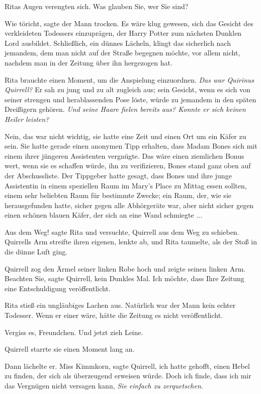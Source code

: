 Ritas Augen verengten sich. \glqq Was glauben Sie, wer Sie sind?\grqq{}

\glqq{}Wie töricht\grqq{}, sagte der Mann trocken. \glqq{}Es wäre klug gewesen,
sich das Gesicht des verkleideten Todessers einzuprägen, der Harry Potter zum
nächsten Dunklen Lord ausbildet. Schließlich\grqq{}, ein dünnes Lächeln, \glqq{}
klingt das sicherlich nach jemandem, dem man nicht auf der Straße begegnen
möchte, vor allem nicht, nachdem man in der Zeitung über ihn hergezogen
hat.\grqq{}

Rita brauchte einen Moment, um die Anspielung einzuordnen. \emph{Das war
Quirinus Quirrell?} Er sah zu jung und zu alt zugleich aus; sein Gesicht, wenn
es sich von seiner strengen und herablassenden Pose löste, würde zu jemandem in
den späten Dreißigern gehören. \emph{Und seine Haare fielen bereits aus? Konnte
er sich keinen Heiler leisten?}


Nein, das war nicht wichtig, sie hatte eine Zeit und einen Ort um ein Käfer zu
sein. Sie hatte gerade einen anonymen Tipp erhalten, dass Madam Bones sich mit
einem ihrer jüngeren Assistenten vergnügte. Das wäre einen ziemlichen Bonus
wert, wenn sie es schaffen würde, ihn zu verifizieren, Bones stand ganz oben auf
der Abschussliste. Der Tippgeber hatte gesagt, dass Bones und ihre junge
Assistentin in einem speziellen Raum im Mary's Place zu Mittag essen sollten,
einem sehr beliebten Raum für bestimmte Zwecke; ein Raum, der, wie sie
herausgefunden hatte, sicher gegen alle Abhörgeräte war, aber nicht sicher gegen
einen schönen blauen Käfer, der sich an eine Wand schmiegte ...

\glqq{}Aus dem Weg!\grqq{} sagte Rita und versuchte, Quirrell aus dem Weg zu
schieben. Quirrells Arm streifte ihren eigenen, lenkte ab, und Rita taumelte,
als der Stoß in die dünne Luft ging.

Quirrell zog den Ärmel seiner linken Robe hoch und zeigte seinen linken Arm.
\glqq{}Beachten Sie\grqq{}, sagte Quirrell, \glqq{}kein Dunkles Mal. Ich möchte,
dass Ihre Zeitung eine Entschuldigung veröffentlicht.\grqq{}

Rita stieß ein ungläubiges Lachen aus. Natürlich war der Mann kein echter
Todesser. Wenn er einer wäre, hätte die Zeitung es nicht veröffentlicht.

\glqq{}Vergiss es, Freundchen. Und jetzt zieh Leine.\grqq{}

Quirrell starrte sie einen Moment lang an.

Dann lächelte er. \glqq{}Miss Kimmkorn\grqq{}, sagte Quirrell, \glqq{}ich hatte
gehofft, einen Hebel zu finden, der sich als überzeugend erweisen würde. Doch
ich finde, dass ich mir das Vergnügen nicht versagen kann, \emph{Sie einfach zu
zerquetschen}.\grqq{}

